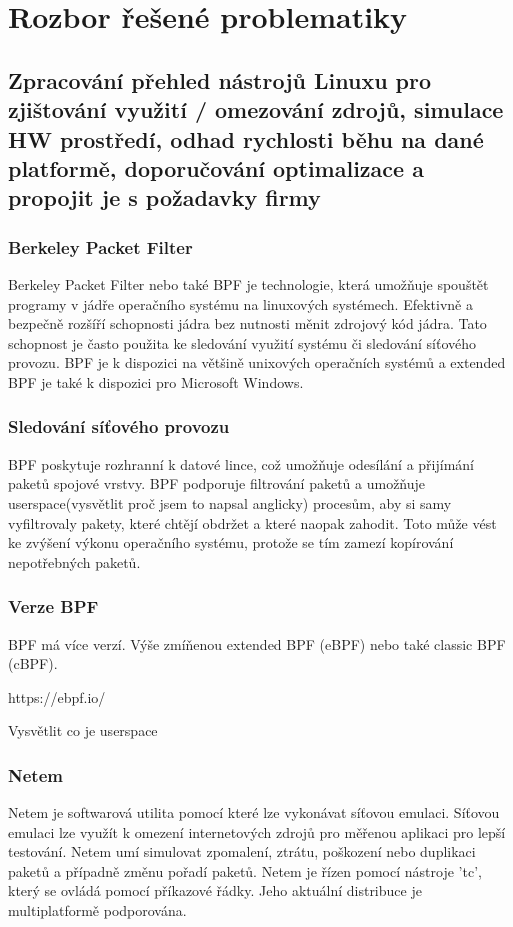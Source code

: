 \chapter{Rozbor řešené problematiky}

\section{Zpracování přehled nástrojů Linuxu pro zjištování využití / omezování zdrojů, simulace HW prostředí, odhad rychlosti běhu na dané platformě, doporučování optimalizace a propojit je s požadavky firmy}

\subsection{Berkeley Packet Filter}

Berkeley Packet Filter nebo také BPF je technologie, která umožňuje spouštět programy v jádře operačního systému na linuxových systémech. 
Efektivně a bezpečně rozšíří schopnosti jádra bez nutnosti měnit zdrojový kód jádra. Tato schopnost je často použita ke sledování využití systému či sledování síťového provozu.
BPF je k dispozici na většině unixových operačních systémů a extended BPF je také k dispozici pro Microsoft Windows.

\subsection*{Sledování síťového provozu}
BPF poskytuje rozhranní k datové lince, což umožňuje odesílání a přijímání paketů spojové vrstvy. BPF podporuje filtrování paketů a umožňuje userspace(vysvětlit proč jsem to napsal anglicky) procesům,
aby si samy vyfiltrovaly pakety, které chtějí obdržet a které naopak zahodit. Toto může vést ke zvýšení výkonu operačního systému, protože se tím zamezí kopírování nepotřebných paketů.

\subsection*{Verze BPF}
BPF má více verzí. Výše zmíňenou extended BPF (eBPF) nebo také classic BPF (cBPF).

https://ebpf.io/

Vysvětlit co je userspace

\subsection{Netem}
Netem je softwarová utilita pomocí které lze vykonávat síťovou emulaci. Síťovou emulaci lze využít k omezení internetových zdrojů pro měřenou aplikaci pro lepší testování.
Netem umí simulovat zpomalení, ztrátu, poškození nebo duplikaci paketů a případně změnu pořadí paketů. Netem je řízen pomocí nástroje 'tc', který se ovládá pomocí příkazové řádky.
Jeho aktuální distribuce je multiplatformě podporována.

